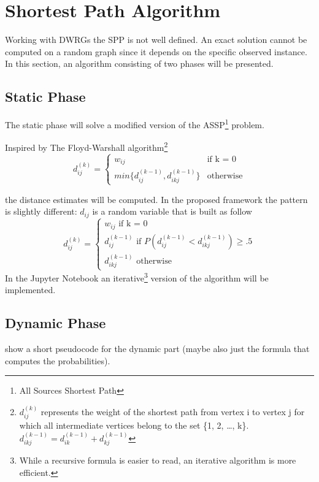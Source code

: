 \section{Shortest Path Algorithm}

Working with DWRGs the SPP is not well defined.
An exact solution cannot be computed on a random graph since it depends on the specific observed instance.
In this section, an algorithm consisting of two phases will be presented.

\subsection{Static Phase}

The static phase will solve a modified version of the ASSP\footnote{All Sources Shortest Path} problem.

Inspired by The Floyd-Warshall\cite{cormen2010introduction} algorithm\footnote{$d_{ij}^{(k)}$ represents the weight of the shortest path from vertex i to vertex j for which all intermediate vertices belong to the set \{1, 2, \dots, k\}. $d_{ikj}^{(k-1)} = d_{ik}^{(k-1)} + d_{kj}^{(k-1)}$}
\begin{equation}
	d_{ij}^{(k)} = 
	\begin{cases}
		w_{ij} & \text{if k = 0} \\
		min\{d_{ij}^{(k-1)}, d_{ikj}^{(k-1)}\} & \text{otherwise}
	\end{cases}
\end{equation}

the distance estimates will be computed.
In the proposed framework the pattern is slightly different: $d_{ij}$ is a random variable that is built as follow
\begin{equation*}
	d_{ij}^{(k)} = 
	\begin{cases}
		w_{ij} \text{ \ \ \ if k = 0} \\
		d_{ij}^{(k-1)} \text{ if } P(d_{ij}^{(k-1)} < d_{ikj}^{(k-1)}) \geq .5 \\
		d_{ikj}^{(k-1)} \text{ otherwise}
	\end{cases}
\end{equation*}
In the Jupyter Notebook an iterative\footnote{While a recursive formula is easier to read, an iterative algorithm is more efficient.} version of the algorithm will be implemented.
\subsection{Dynamic Phase}
show a short pseudocode for the dynamic part (maybe also just the formula that computes the probabilities).